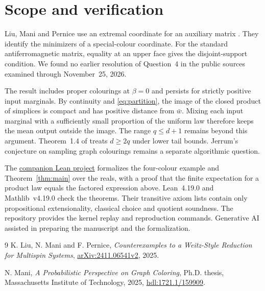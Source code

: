 \documentclass[10pt,reqno]{amsart}
\begin{document}
\section{Scope and verification}

Liu, Mani and Pernice use an extremal coordinate for an auxiliary matrix
\cite[Lemma~2.2 and Remark~3]{LMP}. They identify the minimizers of a
special-colour coordinate. For the standard antiferromagnetic matrix,
equality at an upper face gives the disjoint-support condition. We found
no earlier resolution of Question~4 in the public sources examined through
November~25, 2026.

The result includes proper colourings at $\beta=0$ and persists for strictly
positive input marginals. By continuity and \eqref{eq:partition}, the image
of the closed product of simplices is compact and has positive distance
from $\bar w$. Mixing each input marginal with a sufficiently small
proportion of the uniform law therefore keeps the mean output outside the
image. The range $q\le d+1$ remains beyond this argument. Theorem~1.4
of \cite{LMP} treats $d\ge2q$ under lower tail bounds. Jerrum's conjecture
on sampling graph colourings \cite[Conjecture~1]{LMP} remains a separate
algorithmic question.

The \href{https://github.com/Kazeshima/solved-problems/tree/main/problems/potts-bp-nonconvexity}{companion Lean project}
formalizes the four-colour example and Theorem~\ref{thm:main} over the
reals, with a proof that the finite expectation for a product law equals
the factored expression above. Lean~4.19.0 and Mathlib~v4.19.0 check the
theorems. Their transitive axiom lists contain only propositional
extensionality, classical choice and quotient soundness. The repository
provides the kernel replay and reproduction commands. Generative AI
assisted in preparing the manuscript and the formalization.

\begin{thebibliography}{9}
K. Liu, N. Mani and F. Pernice,
\emph{Counterexamples to a Weitz-Style Reduction for Multispin Systems},
\href{https://arxiv.org/abs/2411.06541v2}{arXiv:2411.06541v2}, 2025.

N. Mani, \emph{A Probabilistic Perspective on Graph Coloring},
Ph.D. thesis, Massachusetts Institute of Technology, 2025,
\href{https://dspace.mit.edu/handle/1721.1/159909}{hdl:1721.1/159909}.
\end{thebibliography}
\end{document}
